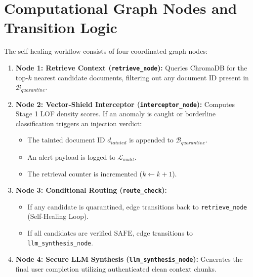 \section{Computational Graph Nodes and Transition Logic}
The self-healing workflow consists of four coordinated graph nodes:
\begin{enumerate}
    \item \textbf{Node 1: Retrieve Context (\texttt{retrieve\_node}):} Queries ChromaDB for the top-$k$ nearest candidate documents, filtering out any document ID present in $\mathcal{B}_{quarantine}$.
    \item \textbf{Node 2: Vector-Shield Interceptor (\texttt{interceptor\_node}):} Computes Stage 1 LOF density scores. If an anomaly is caught or borderline classification triggers an injection verdict:
    \begin{itemize}
        \item The tainted document ID $d_{tainted}$ is appended to $\mathcal{B}_{quarantine}$.
        \item An alert payload is logged to $\mathcal{L}_{audit}$.
        \item The retrieval counter is incremented ($k \leftarrow k + 1$).
    \end{itemize}
    \item \textbf{Node 3: Conditional Routing (\texttt{route\_check}):} 
    \begin{itemize}
        \item If any candidate is quarantined, edge transitions back to \texttt{retrieve\_node} (Self-Healing Loop).
        \item If all candidates are verified $\text{SAFE}$, edge transitions to \texttt{llm\_synthesis\_node}.
    \end{itemize}
    \item \textbf{Node 4: Secure LLM Synthesis (\texttt{llm\_synthesis\_node}):} Generates the final user completion utilizing authenticated clean context chunks.
\end{enumerate}

